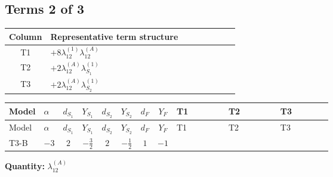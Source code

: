 \documentclass[8pt]{article}
\begin{document}
\begin{landscape}
\subsection*{Terms 2 of 3}
\begin{center}
\begin{tabular}{@{}c >{\raggedright\arraybackslash}p{0.82\linewidth}@{}}
\toprule
Column & Representative term structure \\
\midrule
T1 & \(\displaystyle +8 {\lambda_{12}^{(1)}} {\lambda_{12}^{(A)}}\) \\
\midrule
T2 & \(\displaystyle +2 {\lambda_{12}^{(A)}} {\lambda_{S_1}^{(1)}}\) \\
\midrule
T3 & \(\displaystyle +2 {\lambda_{12}^{(A)}} {\lambda_{S_2}^{(1)}}\) \\
\midrule
\bottomrule
\end{tabular}
\end{center}
\smallskip
\tiny
\begin{longtable}{@{}llcccccc >{\raggedright\arraybackslash}p{0.21\linewidth} >{\raggedright\arraybackslash}p{0.21\linewidth} >{\raggedright\arraybackslash}p{0.21\linewidth}@{}}
\toprule
Model & $\alpha$ & $d_{S_1}$ & $Y_{S_1}$ & $d_{S_2}$ & $Y_{S_2}$ & $d_F$ & $Y_F$ & T1 & T2 & T3 \\
\midrule
\endfirsthead
\toprule
Model & $\alpha$ & $d_{S_1}$ & $Y_{S_1}$ & $d_{S_2}$ & $Y_{S_2}$ & $d_F$ & $Y_F$ & T1 & T2 & T3 \\
\midrule
\endhead
T3-B & $-3$ & $2$ & $-\frac{3}{2}$ & $2$ & $-\frac{1}{2}$ & $1$ & $-1$ & \scriptsize\adjustbox{max width=\linewidth}{$\begin{gathered} +8 {\lambda_{12}^{(1)}} {\lambda_{12}^{(A)}}\end{gathered}$} & \scriptsize\adjustbox{max width=\linewidth}{$\begin{gathered} +2 {\lambda_{12}^{(A)}} {\lambda_{S_1}^{(1)}}\end{gathered}$} & \scriptsize\adjustbox{max width=\linewidth}{$\begin{gathered} +2 {\lambda_{12}^{(A)}} {\lambda_{S_2}^{(1)}}\end{gathered}$} \\
\midrule
\bottomrule
\end{longtable}
\clearpage
\noindent\textbf{Quantity: }$\lambda_{12}^{(A)}$\par\smallskip

\end{landscape}
\end{document}
